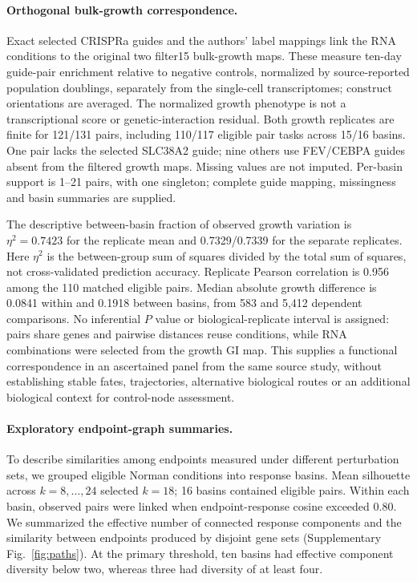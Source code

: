 \documentclass[a4paper,fleqn]{cas-sc}
\makeatletter
\DeclareRobustCommand{\rev}[1]{{\color{red}\def\@citecolor{black}\def\@linkcolor{red}\def\@urlcolor{red}#1}}
\makeatother
\begin{document}
\paragraph{Orthogonal bulk-growth correspondence.}
Exact selected CRISPRa guides and the authors' label mappings link the RNA conditions to the original two filter15 bulk-growth maps. These measure ten-day guide-pair enrichment relative to negative controls, normalized by source-reported population doublings, separately from the single-cell transcriptomes; construct orientations are averaged. The normalized growth phenotype is not a transcriptional score or genetic-interaction residual. Both growth replicates are finite for 121/131 pairs, including 110/117 eligible pair tasks across 15/16 basins. One pair lacks the selected SLC38A2 guide; nine others use FEV/CEBPA guides absent from the filtered growth maps. Missing values are not imputed. Per-basin support is 1--21 pairs, with one singleton; complete guide mapping, missingness and basin summaries are supplied.

The descriptive between-basin fraction of observed growth variation is $\eta^2=0.7423$ for the replicate mean and 0.7329/0.7339 for the separate replicates. Here $\eta^2$ is the between-group sum of squares divided by the total sum of squares, not cross-validated prediction accuracy. Replicate Pearson correlation is 0.956 among the 110 matched eligible pairs. Median absolute growth difference is 0.0841 within and 0.1918 between basins, from 583 and 5,412 dependent comparisons. No inferential $P$ value or biological-replicate interval is assigned: pairs share genes and pairwise distances reuse conditions, while RNA combinations were selected from the growth GI map. This supplies a functional correspondence in an ascertained panel from the same source study, without establishing stable fates, trajectories, alternative biological routes or an additional biological context for control-node assessment.

\paragraph{\rev{Exploratory endpoint-graph summaries.}}

To describe similarities among endpoints measured under different perturbation sets, we grouped eligible Norman conditions into response basins. Mean silhouette across $k=8,\ldots,24$ selected $k=18$; 16 basins contained eligible pairs. Within each basin, observed pairs were linked when endpoint-response cosine exceeded 0.80. \rev{We summarized the effective number of connected response components and the similarity between endpoints produced by disjoint gene sets (Supplementary Fig.~\ref{fig:paths}).} \rev{At the primary threshold, ten basins had effective component diversity below two, whereas three had diversity of at least four.}
\end{document}
